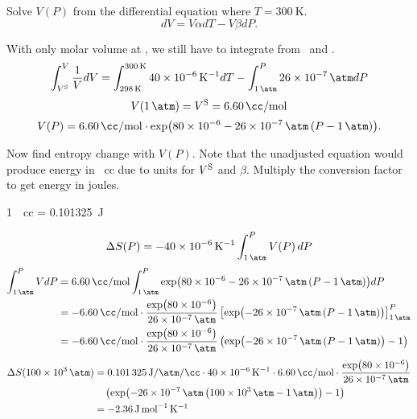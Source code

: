 \begin{@empty}
\begin{answer}
\begin{enumerate}
\begin{@empty}
                Solve $V(P)$ from the differential equation where $T =
                \SI{300}{\kelvin}$.
                \[ dV = V\alpha dT - V\beta dP.\]

                With only molar volume at \stdT, we still have to integrate
                from \stdT\ and \stdP.
                \[
                    \int_{V^{\text S}}^V \frac1V dV
                    = \int_{\stdT}^{\SI{300}{\kelvin}} \thisa dT
                    - \int_{\stdP}^P \thisb dP
                \]
                \[ V(\stdP) = V^{\text S} = \SI{6.60}{\cc/\mol} \]
                \[
                    V(P) = \thisVS \cdot \exp \Left( \exponent \Right).
                \]

                Now find entropy change with $V(P)$.  Note that the unadjusted
                equation would produce energy in \si{\atm.cc} due to units for
                $V^{\text S}$ and $\beta$.  Multiply the conversion factor to get
                energy in joules.
                \begin{center}
                    \SI{1}{\atm.cc} = \SI{0.101325}{\joule}
                \end{center}
                \[ \Delta S(P) = -\thisa \int_{\stdP}^P V(P)\,dP \]
                \begin{align*}
                    \int_{\stdP}^P V dP &= \thisVS \int_{\stdP}^P \exp \Left( \exponent \Right) dP \\
                    &= -\thisVS \cdot \frac{\exp \Left( \num{80e-6} \Right)}{\thisb}
                        \left[ \exp \Left( -\thisb \left( P - \stdP \right) \Right) \right]_{\stdP}^P \\
                    &= -\thisVS \cdot \frac{\exp \Left( \num{80e-6} \Right)}{\thisb}
                        \left( \exp \Left( -\thisb \left( P - \stdP \right) \Right) - 1 \right)
                \end{align*}
                \begin{align*}
                    \Delta S(\SI{100e3}{\atm}) &= \SI[per-mode=fraction]{0.101325}{\joule\per\atm\per\cc}
                        \cdot \thisa \cdot \thisVS \cdot \frac{\exp \Left( \num{80e-6} \Right)}{\thisb} \\
                        &\quad \left( \exp \Left( -\thisb \left( \SI{100e3}{\atm} - \stdP \right) \Right) - 1 \right) \\
                        &= \SI{-2.36}{\joule\per\mol\per\kelvin}
                \end{align*}
            \end{@empty}


\end{enumerate}
\end{answer}
\end{@empty}
